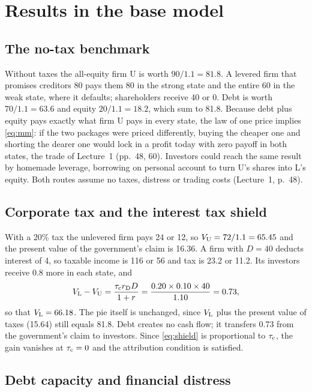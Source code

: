 \section{Results in the base model}\label{sec:base}

\subsection{The no-tax benchmark}\label{sec:notax}

Without taxes the all-equity firm U is worth $90/1.1 = 81.8$. A levered firm that promises creditors 80 pays them 80 in the strong state and the entire 60 in the weak state, where it defaults; shareholders receive 40 or 0. Debt is worth $70/1.1 = 63.6$ and equity $20/1.1 = 18.2$, which sum to 81.8. Because debt plus equity pays exactly what firm U pays in every state, the law of one price implies \eqref{eq:mm}: if the two packages were priced differently, buying the cheaper one and shorting the dearer one would lock in a profit today with zero payoff in both states, the trade of Lecture~1 (pp.~48, 60). Investors could reach the same result by homemade leverage, borrowing on personal account to turn U's shares into L's equity. Both routes assume no taxes, distress or trading costs (Lecture~1, p.~48).

\subsection{Corporate tax and the interest tax shield}\label{sec:tax}

With a 20\% tax the unlevered firm pays 24 or 12, so $V_{\mathrm{U}} = 72/1.1 = 65.45$ and the present value of the government's claim is 16.36. A firm with $D = 40$ deducts interest of 4, so taxable income is 116 or 56 and tax is 23.2 or 11.2. Its investors receive 0.8 more in each state, and
\begin{equation}
  V_{\mathrm{L}} - V_{\mathrm{U}} = \frac{\tau_{\mathrm{c}} r_{\mathrm{D}} D}{1 + r} = \frac{0.20 \times 0.10 \times 40}{1.10} = 0.73,
  \label{eq:shield}
\end{equation}
so that $V_{\mathrm{L}} = 66.18$. The pie itself is unchanged, since $V_{\mathrm{L}}$ plus the present value of taxes (15.64) still equals 81.8. Debt creates no cash flow; it transfers 0.73 from the government's claim to investors. Since \eqref{eq:shield} is proportional to $\tau_{\mathrm{c}}$, the gain vanishes at $\tau_{\mathrm{c}} = 0$ and the attribution condition is satisfied.

\subsection{Debt capacity and financial distress}\label{sec:capacity}

